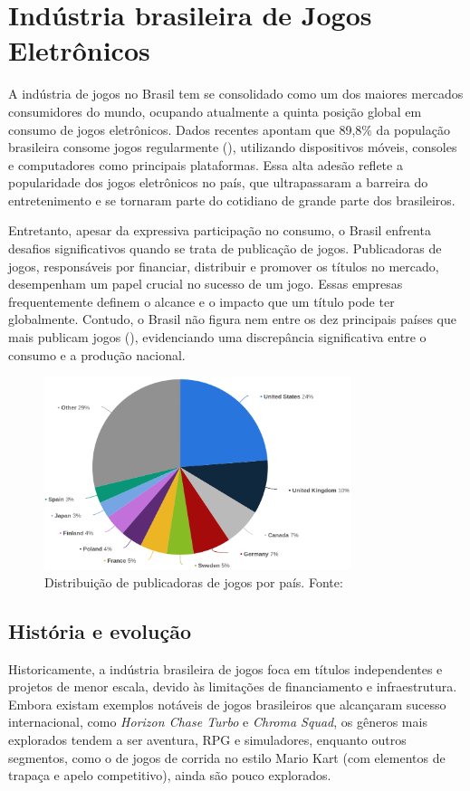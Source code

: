 \chapter{Indústria brasileira de Jogos Eletrônicos}

A indústria de jogos no Brasil tem se consolidado como um dos maiores mercados consumidores do mundo, ocupando atualmente a quinta posição global em consumo de jogos eletrônicos. Dados recentes apontam que 89,8\% da população brasileira consome jogos regularmente (\cite{internetGame:share}), utilizando dispositivos móveis, consoles e computadores como principais plataformas. Essa alta adesão reflete a popularidade dos jogos eletrônicos no país, que ultrapassaram a barreira do entretenimento e se tornaram parte do cotidiano de grande parte dos brasileiros.

Entretanto, apesar da expressiva participação no consumo, o Brasil enfrenta desafios significativos quando se trata de publicação de jogos. Publicadoras de jogos, responsáveis por financiar, distribuir e promover os títulos no mercado, desempenham um papel crucial no sucesso de um jogo. Essas empresas frequentemente definem o alcance e o impacto que um título pode ter globalmente. Contudo, o Brasil não figura nem entre os dez principais países que mais publicam jogos (\cite{publishers:country}), evidenciando uma discrepância significativa entre o consumo e a produção nacional.

\begin{figure}[H]
    \centering
    \includegraphics[width=0.8\textwidth]{figuras/Devs by Country.png}
    \caption{Distribuição de publicadoras de jogos por país. Fonte: \cite{publishers:country}}
    \label{fig:jogos-brasil}
\end{figure}

\section{História e evolução}
Historicamente, a indústria brasileira de jogos foca em títulos independentes e projetos de menor escala, devido às limitações de financiamento e infraestrutura. Embora existam exemplos notáveis de jogos brasileiros que alcançaram sucesso internacional, como \textit{Horizon Chase Turbo}\label{Língua estrangeira} e \textit{Chroma Squad}, os gêneros mais explorados tendem a ser aventura, RPG e simuladores, enquanto outros segmentos, como o de jogos de corrida no estilo Mario Kart (com elementos de trapaça e apelo competitivo), ainda são pouco explorados.

